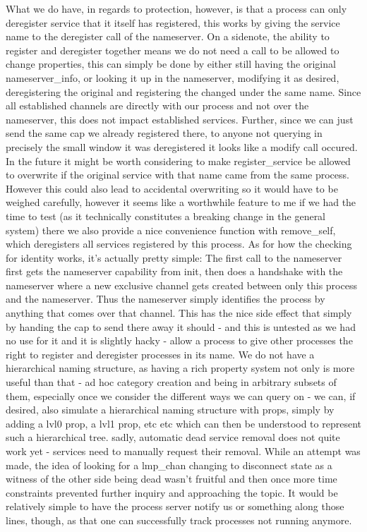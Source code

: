 What we do have, in regards to protection, however, is that a process can only deregister service that it itself has registered, this works by giving the service name to the deregister call of the nameserver. On a sidenote, the ability to register and deregister together means we do not need a call to be allowed to change properties, this can simply be done by either still having the original nameserver\_info, or looking it up in the nameserver, modifying it as desired, deregistering the original and registering the changed under the same name. Since all established channels are directly with our process and not over the nameserver, this does not impact established services. Further, since we can just send the same cap we already registered there, to anyone not querying in precisely the small window it was deregistered it looks like a modify call occured.
In the future it might be worth considering to make register\_service be allowed to overwrite if the original service with that name came from the same process. However this could also lead to accidental overwriting so it would have to be weighed carefully, however it seems like a worthwhile feature to me if we had the time to test (as it technically constitutes a breaking change in the general system)
there we also provide a nice convenience function with remove\_self, which deregisters all services registered by this process.
As for how the checking for identity works, it's actually pretty simple:
The first call to the nameserver first gets the nameserver capability from init, then does a handshake with the nameserver where a new exclusive channel gets created between only this process and the nameserver. Thus the nameserver simply identifies the process by anything that comes over that channel. This has the nice side effect that simply by handing the cap to send there away it should - and this is untested as we had no use for it and it is slightly hacky - allow a process to give other processes the right to register and deregister processes in its name.
We do not have a hierarchical naming structure, as having a rich property system not only is more useful than that - ad hoc category creation and being in arbitrary subsets of them, especially once we consider the different ways we can query on - we can, if desired, also simulate a hierarchical naming structure with props, simply by adding a lvl0 prop, a lvl1 prop, etc etc which can then be understood to represent such a hierarchical tree.
sadly, automatic dead service removal does not quite work yet - services need to manually request their removal. While an attempt was made, the idea of looking for a lmp\_chan changing to disconnect state as a witness of the other side being dead wasn't fruitful and then once more time constraints prevented further inquiry and approaching the topic. It would be relatively simple to have the process server notify us or something along those lines, though, as that one can successfully track processes not running anymore.

